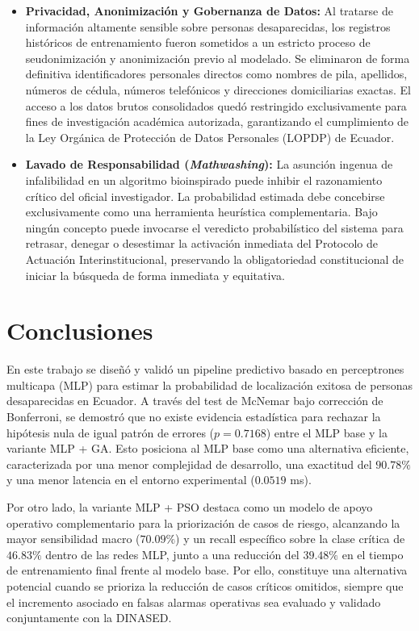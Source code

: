 \documentclass[conference]{IEEEtran}
\begin{document}
\begin{itemize}
    \item \textbf{Privacidad, Anonimización y Gobernanza de Datos:} Al tratarse de información altamente sensible sobre personas desaparecidas, los registros históricos de entrenamiento fueron sometidos a un estricto proceso de seudonimización y anonimización previo al modelado. Se eliminaron de forma definitiva identificadores personales directos como nombres de pila, apellidos, números de cédula, números telefónicos y direcciones domiciliarias exactas. El acceso a los datos brutos consolidados quedó restringido exclusivamente para fines de investigación académica autorizada, garantizando el cumplimiento de la Ley Orgánica de Protección de Datos Personales (LOPDP) de Ecuador.
    \item \textbf{Lavado de Responsabilidad (\textit{Mathwashing}):} La asunción ingenua de infalibilidad en un algoritmo bioinspirado puede inhibir el razonamiento crítico del oficial investigador. La probabilidad estimada debe concebirse exclusivamente como una herramienta heurística complementaria. Bajo ningún concepto puede invocarse el veredicto probabilístico del sistema para retrasar, denegar o desestimar la activación inmediata del Protocolo de Actuación Interinstitucional, preservando la obligatoriedad constitucional de iniciar la búsqueda de forma inmediata y equitativa.
\end{itemize}

\section{Conclusiones}
En este trabajo se diseñó y validó un pipeline predictivo basado en perceptrones multicapa (MLP) para estimar la probabilidad de localización exitosa de personas desaparecidas en Ecuador. A través del test de McNemar bajo corrección de Bonferroni, se demostró que no existe evidencia estadística para rechazar la hipótesis nula de igual patrón de errores ($p = 0.7168$) entre el MLP base y la variante MLP + GA. Esto posiciona al MLP base como una alternativa eficiente, caracterizada por una menor complejidad de desarrollo, una exactitud del $90.78\%$ y una menor latencia en el entorno experimental ($0.0519$ ms).

Por otro lado, la variante MLP + PSO destaca como un modelo de apoyo operativo complementario para la priorización de casos de riesgo, alcanzando la mayor sensibilidad macro ($70.09\%$) y un recall específico sobre la clase crítica de $46.83\%$ dentro de las redes MLP, junto a una reducción del $39.48\%$ en el tiempo de entrenamiento final frente al modelo base. Por ello, constituye una alternativa potencial cuando se prioriza la reducción de casos críticos omitidos, siempre que el incremento asociado en falsas alarmas operativas sea evaluado y validado conjuntamente con la DINASED.
\end{document}
